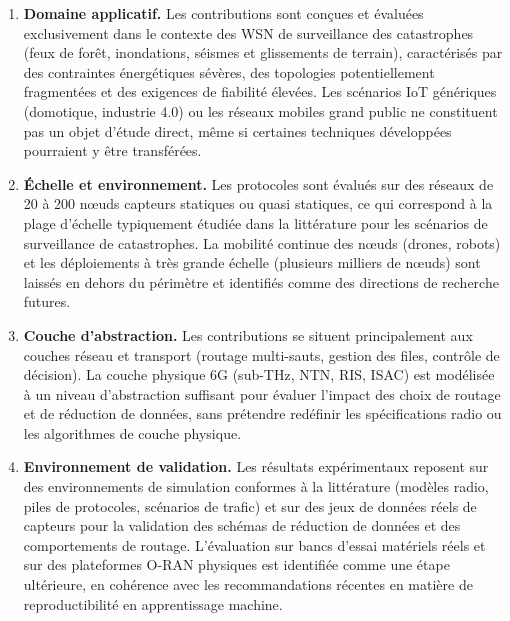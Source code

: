 \begin{enumerate}
  \item \textbf{Domaine applicatif.} Les contributions sont conçues et évaluées exclusivement dans le contexte des WSN de surveillance des catastrophes (feux de forêt, inondations, séismes et glissements de terrain), caractérisés par des contraintes énergétiques sévères, des topologies potentiellement fragmentées et des exigences de fiabilité élevées\cite{erdelj2017disaster,alsayyed2025disaster}. Les scénarios IoT génériques (domotique, industrie 4.0) ou les réseaux mobiles grand public ne constituent pas un objet d'étude direct, même si certaines techniques développées pourraient y être transférées.

  \item \textbf{Échelle et environnement.} Les protocoles sont évalués sur des réseaux de 20 à 200 nœuds capteurs statiques ou quasi statiques, ce qui correspond à la plage d'échelle typiquement étudiée dans la littérature pour les scénarios de surveillance de catastrophes\cite{erdelj2017disaster,biabani_energy-efficient_2020,dampage_forest_2022-1}. La mobilité continue des nœuds (drones, robots) et les déploiements à très grande échelle (plusieurs milliers de nœuds) sont laissés en dehors du périmètre et identifiés comme des directions de recherche futures.

  \item \textbf{Couche d'abstraction.} Les contributions se situent principalement aux couches réseau et transport (routage multi-sauts, gestion des files, contrôle de décision). La couche physique 6G (sub-THz, NTN, RIS, ISAC) est modélisée à un niveau d'abstraction suffisant pour évaluer l'impact des choix de routage et de réduction de données, sans prétendre redéfinir les spécifications radio ou les algorithmes de couche physique\cite{saad2020vision6g,ns3_thz,amatetti2024ntn,alhilo2024ris_uav}.

  \item \textbf{Environnement de validation.} Les résultats expérimentaux reposent sur des environnements de simulation conformes à la littérature (modèles radio, piles de protocoles, scénarios de trafic) et sur des jeux de données réels de capteurs pour la validation des schémas de réduction de données et des comportements de routage\cite{intel_lab_data,erdelj2017disaster,dampage_forest_2022-1}. L'évaluation sur bancs d'essai matériels réels et sur des plateformes O-RAN physiques est identifiée comme une étape ultérieure, en cohérence avec les recommandations récentes en matière de reproductibilité en apprentissage machine\cite{Pineau2021Reproducibility,demichelis2025edge,demirel2026agentic}.
\end{enumerate}

